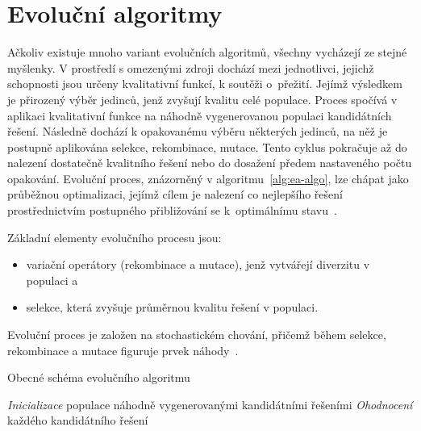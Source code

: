 \section{Evoluční algoritmy}\label{sec:ea}
Ačkoliv existuje mnoho variant evolučních algoritmů, všechny vycházejí ze stejné myšlenky. 
V prostředí s omezenými zdroji dochází mezi jednotlivci, jejichž schopnosti jsou určeny kvalitativní funkcí, k soutěži o~přežití. 
Jejímž výsledkem je přirozený výběr jedinců, jenž zvyšují kvalitu celé populace. 
Proces spočívá v aplikaci kvalitativní funkce na náhodně vygenerovanou populaci kandidátních řešení. 
Následně dochází k opakovanému výběru některých jedinců, na něž je postupně aplikována selekce, rekombinace, mutace. 
Tento cyklus pokračuje až do nalezení dostatečně kvalitního řešení nebo do dosažení předem nastaveného počtu opakování.  
Evoluční proces, znázorněný v algoritmu~\ref{alg:ea-algo}, lze chápat jako průběžnou optimalizaci, jejímž cílem je nalezení co nejlepšího řešení prostřednictvím postupného přibližování se k~optimálnímu stavu~\cite{IntroductionToEvoComputing}. 

Základní elementy evolučního procesu jsou:
\begin{itemize}
    \item variační operátory (rekombinace a mutace), jenž vytvářejí diverzitu v populaci a
    \item selekce, která zvyšuje průměrnou kvalitu řešení v populaci. 
\end{itemize}
Evoluční proces je založen na stochastickém chování, přičemž během selekce, rekombinace a mutace figuruje prvek náhody~\cite{IntroductionToEvoComputing}. 

\begin{algorithm}[H]
    \caption{Obecné schéma evolučního algoritmu~\cite{IntroductionToEvoComputing}}
    \label{alg:ea-algo}
    \emph{Inicializace} populace náhodně vygenerovanými kandidátními řešeními\;
    \emph{Ohodnocení} každého kandidátního řešení\;
\end{algorithm}

